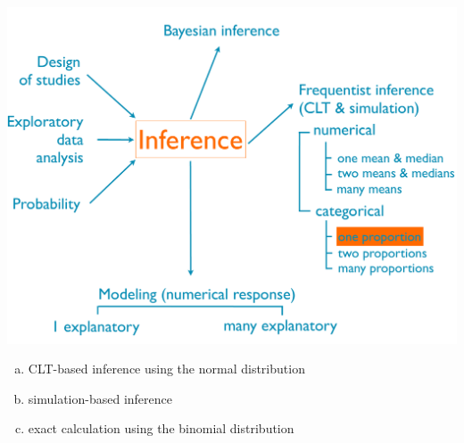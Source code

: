 \documentclass[11pt,containsverbatim,handout,xcolor=xelatex,dvipsnames,table]{beamer}
\newcommand{\solnMult}[1]{#1}
\begin{document}
\begin{frame}

{
{\scriptsize
{}}}
{
 \includegraphics[width=\textwidth]{figures/map/one_prop}
}

\vfill

\begin{enumerate}[(a)]
\item \solnMult{CLT-based inference using the normal distribution}
\item simulation-based inference
\item \solnMult{exact calculation using the binomial distribution}
\end{enumerate}

\end{frame}

\end{document}
